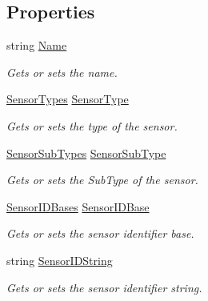 \subsection*{Properties}
\begin{DoxyCompactItemize}
\item 
string \hyperlink{class_a_rdev_kit_1_1_model_1_1_project_1_1_abstract_sensor_ae9ff3a8ab9d8d8a357173cfa55a7030f}{Name}
\begin{DoxyCompactList}\small\item\em Gets or sets the name. \end{DoxyCompactList}\item 
\hyperlink{class_a_rdev_kit_1_1_model_1_1_project_1_1_abstract_sensor_a1954adedcf2a2f61256c9b11fe0c8386}{Sensor\-Types} \hyperlink{class_a_rdev_kit_1_1_model_1_1_project_1_1_abstract_sensor_a66bde8348688b03400befc56c6ce8384}{Sensor\-Type}
\begin{DoxyCompactList}\small\item\em Gets or sets the type of the sensor. \end{DoxyCompactList}\item 
\hyperlink{class_a_rdev_kit_1_1_model_1_1_project_1_1_abstract_sensor_af7b41fc81d926ed779ca02ef894fcddf}{Sensor\-Sub\-Types} \hyperlink{class_a_rdev_kit_1_1_model_1_1_project_1_1_abstract_sensor_a092d1bd99165833488f9ce744a1bf65d}{Sensor\-Sub\-Type}
\begin{DoxyCompactList}\small\item\em Gets or sets the Sub\-Type of the sensor. \end{DoxyCompactList}\item 
\hyperlink{class_a_rdev_kit_1_1_model_1_1_project_1_1_abstract_sensor_a8eecc60106e6a54a3e096c63a7d4d012}{Sensor\-I\-D\-Bases} \hyperlink{class_a_rdev_kit_1_1_model_1_1_project_1_1_abstract_sensor_a51a87ecf568c53df079db7af4a553bc6}{Sensor\-I\-D\-Base}
\begin{DoxyCompactList}\small\item\em Gets or sets the sensor identifier base. \end{DoxyCompactList}\item 
string \hyperlink{class_a_rdev_kit_1_1_model_1_1_project_1_1_abstract_sensor_a054724aa9c411a5f813d977c7c1f620c}{Sensor\-I\-D\-String}
\begin{DoxyCompactList}\small\item\em Gets or sets the sensor identifier string. \end{DoxyCompactList}\end{DoxyCompactItemize}


